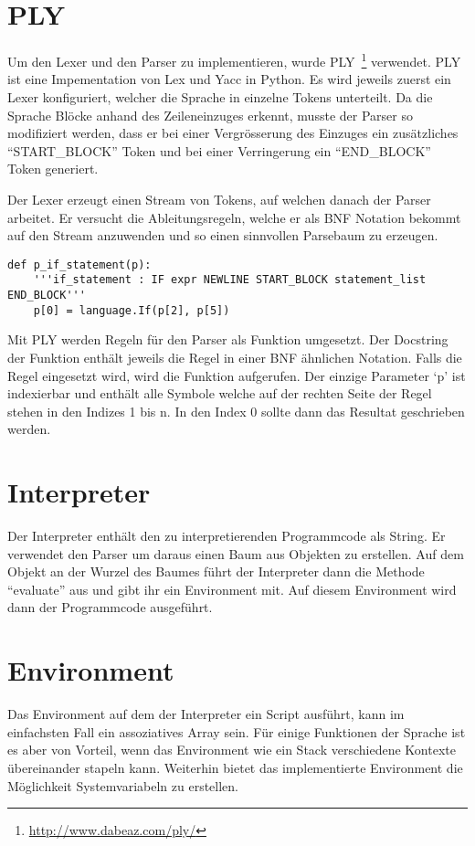 \section{PLY}
\label{sec:ply}
Um den Lexer und den Parser zu implementieren, wurde PLY~\footnote{\url{http://www.dabeaz.com/ply/}} verwendet. PLY ist eine Impementation von Lex und Yacc in Python. Es wird jeweils zuerst ein Lexer konfiguriert, welcher die Sprache in einzelne Tokens unterteilt. Da die Sprache Blöcke anhand des Zeileneinzuges erkennt, musste der Parser so modifiziert werden, dass er bei einer Vergrösserung des Einzuges ein zusätzliches ``START\_BLOCK'' Token und bei einer Verringerung ein ``END\_BLOCK'' Token generiert.

Der Lexer erzeugt einen Stream von Tokens, auf welchen danach der Parser arbeitet. Er versucht die Ableitungsregeln, welche er als BNF Notation bekommt auf den Stream anzuwenden und so einen sinnvollen Parsebaum zu erzeugen.

\begin{lstlisting}
def p_if_statement(p):
    '''if_statement : IF expr NEWLINE START_BLOCK statement_list END_BLOCK'''
    p[0] = language.If(p[2], p[5])
\end{lstlisting}

Mit PLY werden Regeln für den Parser als Funktion umgesetzt. Der Docstring der Funktion enthält jeweils die Regel in einer BNF ähnlichen Notation. Falls die Regel eingesetzt wird, wird die Funktion aufgerufen. Der einzige Parameter `p' ist indexierbar und enthält alle Symbole welche auf der rechten Seite der Regel stehen in den Indizes 1 bis n. In den Index 0 sollte dann das Resultat geschrieben werden.

\section{Interpreter}
\label{sec:interpreter}
Der Interpreter enthält den zu interpretierenden Programmcode als String. Er verwendet den Parser um daraus einen Baum aus Objekten zu erstellen. Auf dem Objekt an der Wurzel des Baumes führt der Interpreter dann die Methode ``evaluate'' aus und gibt ihr ein Environment mit. Auf diesem Environment wird dann der Programmcode ausgeführt.

\section{Environment}
\label{sec:environment}
Das Environment auf dem der Interpreter ein Script ausführt, kann im einfachsten Fall ein assoziatives Array sein. Für einige Funktionen der Sprache ist es aber von Vorteil, wenn das Environment wie ein Stack verschiedene Kontexte übereinander stapeln kann. Weiterhin bietet das implementierte Environment die Möglichkeit Systemvariabeln zu erstellen.